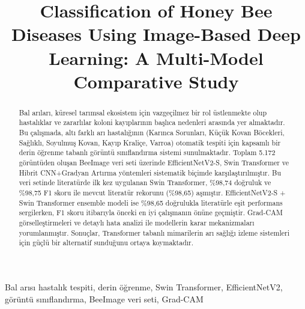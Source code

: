 \documentclass[conference]{IEEEtran}
\begin{document}

\title{Classification of Honey Bee Diseases Using Image-Based Deep Learning: A Multi-Model Comparative Study}

\author{
}

\maketitle

\begin{abstract}
Bal arıları, küresel tarımsal ekosistem için vazgeçilmez bir rol üstlenmekte olup hastalıklar ve zararlılar koloni kayıplarının başlıca nedenleri arasında yer almaktadır. Bu çalışmada, altı farklı arı hastalığının (Karınca Sorunları, Küçük Kovan Böcekleri, Sağlıklı, Soyulmuş Kovan, Kayıp Kraliçe, Varroa) otomatik tespiti için kapsamlı bir derin öğrenme tabanlı görüntü sınıflandırma sistemi sunulmaktadır. Toplam 5.172 görüntüden oluşan BeeImage veri seti üzerinde EfficientNetV2-S, Swin Transformer ve Hibrit CNN+Gradyan Artırma yöntemleri sistematik biçimde karşılaştırılmıştır. Bu veri setinde literatürde ilk kez uygulanan Swin Transformer, \%98,74 doğruluk ve \%98,75 F1 skoru ile mevcut literatür rekorunu (\%98,65) aşmıştır. EfficientNetV2-S + Swin Transformer ensemble modeli ise \%98,65 doğrulukla literatürle eşit performans sergilerken, F1 skoru itibarıyla önceki en iyi çalışmanın önüne geçmiştir. Grad-CAM görselleştirmeleri ve detaylı hata analizi ile modellerin karar mekanizmaları yorumlanmıştır. Sonuçlar, Transformer tabanlı mimarilerin arı sağlığı izleme sistemleri için güçlü bir alternatif sunduğunu ortaya koymaktadır.
\end{abstract}

\begin{IEEEkeywords}
Bal arısı hastalık tespiti, derin öğrenme, Swin Transformer, EfficientNetV2, görüntü sınıflandırma, BeeImage veri seti, Grad-CAM
\end{IEEEkeywords}

\end{document}
